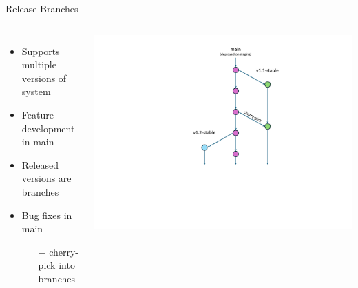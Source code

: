 \documentclass{slide}
\begin{document}

\begin{frame}{Release Branches \cite{gitlab-flow}}
    \vspace{1pt}
    \begin{columns}
      \vspace{-5mm}
      {\LARGE
        \begin{itemize}
            \item { Supports multiple versions of system\\}
            \item Feature development in main
            \item Released versions are branches
            \vspace{3mm}
            \item Bug fixes in main
            \begin{itemize}
                \Large\item[$-$] cherry-pick into branches
            \end{itemize}
        \end{itemize}
      }
        \centering
        \includegraphics[trim=255 130 125 33,clip,height=\textheight]{diagrams/branching-diagrams/release-branches}
    \end{columns}
\end{frame}
\end{document}
